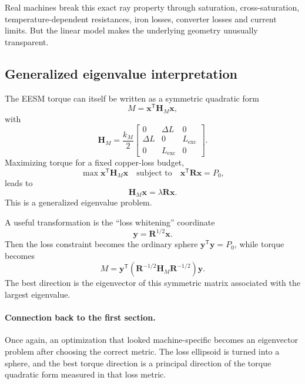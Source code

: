 \documentclass[11pt,a4paper]{article}
\newcommand{\Lexc}{L_{\mathrm{exc}}}
\newcommand{\T}{\mathsf{T}}
\newcommand{\vct}[1]{\bm{#1}}
\newcommand{\mat}[1]{\bm{#1}}
\begin{document}
Real machines break this exact ray property through saturation, cross-saturation, temperature-dependent resistances, iron losses, converter losses and current limits. But the linear model makes the underlying geometry unusually transparent.

\subsection{Generalized eigenvalue interpretation}

The EESM torque can itself be written as a symmetric quadratic form
\begin{equation}
  M=\vct x^\T\mat H_M\vct x,
\end{equation}
with
\begin{equation}
  \mat H_M=
  \frac{k_M}{2}
  \begin{bmatrix}
  0&\Delta L&0\\
  \Delta L&0&\Lexc\\
  0&\Lexc&0
  \end{bmatrix}.
  \label{eq:HM}
\end{equation}
Maximizing torque for a fixed copper-loss budget,
\begin{equation}
  \max \vct x^\T\mat H_M\vct x
  \quad\text{subject to}\quad
  \vct x^\T\mat R\vct x=P_0,
\end{equation}
leads to
\begin{equation}
  \mat H_M\vct x=\lambda\mat R\vct x.
  \label{eq:generalized-eigen}
\end{equation}
This is a generalized eigenvalue problem.

A useful transformation is the ``loss whitening'' coordinate
\begin{equation}
  \vct y=\mat R^{1/2}\vct x.
\end{equation}
Then the loss constraint becomes the ordinary sphere $\vct y^\T\vct y=P_0$, while torque becomes
\begin{equation}
  M=\vct y^\T
  \left(\mat R^{-1/2}\mat H_M\mat R^{-1/2}\right)
  \vct y.
\end{equation}
The best direction is the eigenvector of this symmetric matrix associated with the largest eigenvalue.

\paragraph{Connection back to the first section.}
Once again, an optimization that looked machine-specific becomes an eigenvector problem after choosing the correct metric. The loss ellipsoid is turned into a sphere, and the best torque direction is a principal direction of the torque quadratic form measured in that loss metric.
\end{document}
